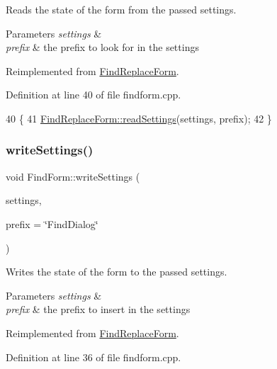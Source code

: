 Reads the state of the form from the passed settings. 
\begin{DoxyParams}{Parameters}
{\em settings} & \\
\hline
{\em prefix} & the prefix to look for in the settings \\
\hline
\end{DoxyParams}


Reimplemented from \hyperlink{class_find_replace_form_a87e0f16b427e570ede2a219b16300c2a}{Find\+Replace\+Form}.



Definition at line 40 of file findform.\+cpp.


\begin{DoxyCode}
40                                                                       \{
41     \hyperlink{class_find_replace_form_a87e0f16b427e570ede2a219b16300c2a}{FindReplaceForm::readSettings}(settings, prefix);
42 \}
\end{DoxyCode}
\mbox{\label{class_find_form_a8d9f1b06d14a58d2d2a91d1d82205b4d}} 
\subsubsection{\texorpdfstring{write\+Settings()}{writeSettings()}}
{\footnotesize\ttfamily void Find\+Form\+::write\+Settings (\begin{DoxyParamCaption}\item[{Q\+Settings \&}]{settings,  }\item[{const Q\+String \&}]{prefix = {\ttfamily \char`\"{}FindDialog\char`\"{}} }\end{DoxyParamCaption})\hspace{0.3cm}{\ttfamily [virtual]}}

Writes the state of the form to the passed settings. 
\begin{DoxyParams}{Parameters}
{\em settings} & \\
\hline
{\em prefix} & the prefix to insert in the settings \\
\hline
\end{DoxyParams}


Reimplemented from \hyperlink{class_find_replace_form_a8746401be4fbab54b6019a76e05e7b43}{Find\+Replace\+Form}.



Definition at line 36 of file findform.\+cpp.



